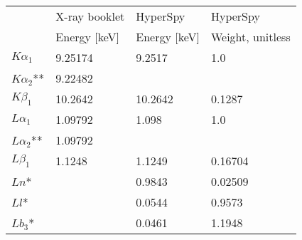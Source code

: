 
\begin{table}[tbp]
    \centering
    \begin{tabular}{llll}
                       & X-ray booklet & HyperSpy     & HyperSpy         \\
                       & Energy [keV]  & Energy [keV] & Weight, unitless \\
        \hline
        $K \alpha_1$   & 9.25174       & 9.2517       & 1.0              \\
        $K \alpha_2$** & 9.22482       &              &                  \\
        $K \beta_1$    & 10.2642       & 10.2642      & 0.1287           \\
        $L \alpha_1$   & 1.09792       & 1.098        & 1.0              \\
        $L \alpha_2$** & 1.09792       &              &                  \\
        $L \beta_1$    & 1.1248        & 1.1249       & 0.16704          \\
        $Ln$*          &               & 0.9843       & 0.02509          \\
        $Ll$*          &               & 0.0544       & 0.9573           \\
        $Lb_3$*        &               & 0.0461       & 1.1948
    \end{tabular}

\end{table}